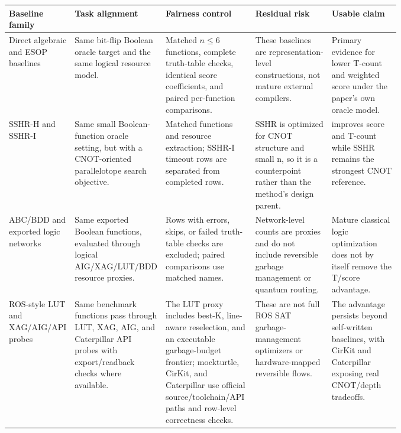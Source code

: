 \begin{tabularx}{\linewidth}{>{\raggedright\arraybackslash}p{0.16\linewidth}>{\raggedright\arraybackslash}X>{\raggedright\arraybackslash}p{0.23\linewidth}>{\raggedright\arraybackslash}p{0.20\linewidth}>{\raggedright\arraybackslash}p{0.18\linewidth}}
\toprule
Baseline family & Task alignment & Fairness control & Residual risk & Usable claim \\
\midrule
Direct algebraic and ESOP baselines & Same bit-flip Boolean oracle target and the same logical resource model. & Matched $n\leq6$ functions, complete truth-table checks, identical score coefficients, and paired per-function comparisons. & These baselines are representation-level constructions, not mature external compilers. & Primary evidence for lower T-count and weighted score under the paper's own oracle model. \\
SSHR-H and SSHR-I & Same small Boolean-function oracle setting, but with a CNOT-oriented parallelotope search objective. & Matched functions and resource extraction; SSHR-I timeout rows are separated from completed rows. & SSHR is optimized for CNOT structure and small n, so it is a counterpoint rather than the method's design parent. & \method{} improves score and T-count while SSHR remains the strongest CNOT reference. \\
ABC/\allowbreak{}BDD and exported logic networks & Same exported Boolean functions, evaluated through logical AIG/\allowbreak{}XAG/\allowbreak{}LUT/\allowbreak{}BDD resource proxies. & Rows with errors, skips, or failed truth-table checks are excluded; paired comparisons use matched names. & Network-level counts are proxies and do not include reversible garbage management or quantum routing. & Mature classical logic optimization does not by itself remove the T/\allowbreak{}score advantage. \\
ROS-style LUT and XAG/\allowbreak{}AIG/\allowbreak{}API probes & Same benchmark functions pass through LUT, XAG, AIG, and Caterpillar API probes with export/\allowbreak{}readback checks where available. & The LUT proxy includes best-K, line-aware reselection, and an executable garbage-budget frontier; mockturtle, CirKit, and Caterpillar use official source/\allowbreak{}toolchain/\allowbreak{}API paths and row-level correctness checks. & These are not full ROS SAT garbage-management optimizers or hardware-mapped reversible flows. & The advantage persists beyond self-written baselines, with CirKit and Caterpillar exposing real CNOT/\allowbreak{}depth tradeoffs. \\

\end{tabularx}

